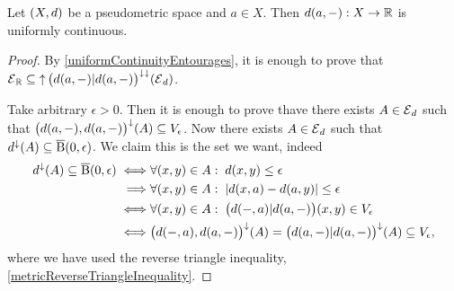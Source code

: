 \begin{lemma} \label{partialApplicationMetricUniformlyContinuous}
Let $\sSet{X,d}$ be a pseudometric space and $a\in X$. Then $d(a, -): X\to \mathbb{R}$ is uniformly continuous.
\end{lemma}
\begin{proof}
By \ref{uniformContinuityEntourages}, it is enough to prove that $\operatorname{\mathcal{E}}_{\mathbb{R}} \subseteq \operatorname{\uparrow} \big(d(a, -)|d(a,-)\big)^{\downarrow\downarrow}(\operatorname{\mathcal{E}}_d)$.

Take arbitrary $\epsilon>0$. Then it is enough to prove thave there exists $A\in \operatorname{\mathcal{E}}_d$ such that $\big(d(a, -), d(a,-)\big)^{\downarrow}(A) \subseteq V_\epsilon$. Now there exists $A\in \operatorname{\mathcal{E}}_d$ such that $d^{\downarrow}(A)\subseteq \operatorname{\overline{B}}(0,\epsilon)$. We claim this is the set we want, indeed
\begin{align*}
d^{\downarrow}(A)\subseteq \operatorname{\overline{B}}(0,\epsilon) \iff& \forall (x,y)\in A: \; d(x,y) \leq \epsilon \\
\implies& \forall (x,y)\in A: \; |d(x,a) - d(a,y)| \leq \epsilon \\
\iff& \forall (x,y)\in A: \; \big(d(-,a)|d(a,-)\big)(x,y) \in V_\epsilon \\
\iff& \big(d(-,a), d(a,-)\big)^\downarrow(A) = \big(d(a,-)|d(a,-)\big)^\downarrow(A) \subseteq V_\epsilon,
\end{align*}
where we have used the reverse triangle inequality, \ref{metricReverseTriangleInequality}.
\end{proof}


